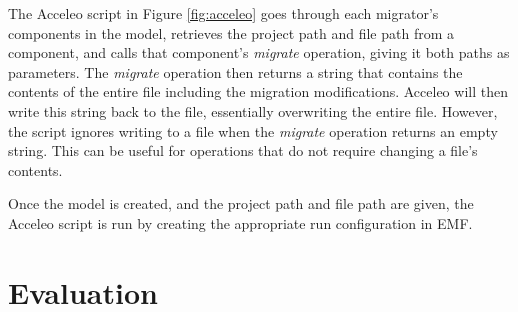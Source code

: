\documentclass[conference]{IEEEtran}
\begin{document}
The Acceleo script in Figure \ref{fig:acceleo} goes through each migrator’s components in the model, retrieves the project path and file path from a component, and calls that component’s \textit{migrate} operation, giving it both paths as parameters. The \textit{migrate} operation then returns a string that contains the contents of the entire file including the migration modifications. Acceleo will then write this string back to the file, essentially overwriting the entire file. However, the script ignores writing to a file when the \textit{migrate} operation returns an empty string. This can be useful for operations that do not require changing a file’s contents.

Once the model is created, and the project path and file path are given, the Acceleo script is run by creating the appropriate run configuration in EMF.

\section{Evaluation}
\end{document}
